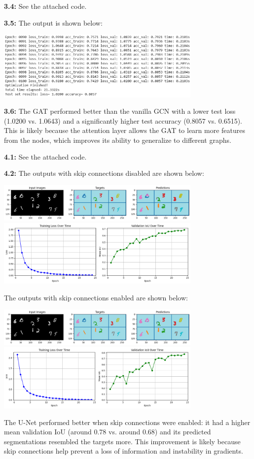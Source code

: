 \documentclass[12pt]{article}
\begin{document}
\textbf{3.4:} See the attached code.

\textbf{3.5:} The output is shown below:
\begin{center}
    \includegraphics[width=0.75\textwidth]{3.5.png}
\end{center}

\textbf{3.6:} The GAT performed better than the vanilla GCN with a lower test loss (1.0200 vs. 1.0643) and a significantly higher test accuracy (0.8057 vs. 0.6515). This is likely because the attention layer allows the GAT to learn more features from the nodes, which improves its ability to generalize to different graphs.

\textbf{4.1:} See the attached code.

\textbf{4.2:} The outputs with skip connections disabled are shown below:
\begin{center}
    \includegraphics[width=0.75\textwidth]{4.2-1.png}
    \includegraphics[width=0.75\textwidth]{4.2-2.png}
\end{center}

The outputs with skip connections enabled are shown below:
\begin{center}
    \includegraphics[width=0.75\textwidth]{4.2-3.png}
    \includegraphics[width=0.75\textwidth]{4.2-4.png}
\end{center} The U-Net performed better when skip connections were enabled: it had a higher mean validation IoU (around 0.78 vs. around 0.68) and its predicted segmentations resembled the targets more. This improvement is likely because skip connections help prevent a loss of information and instability in gradients.
\end{document}
